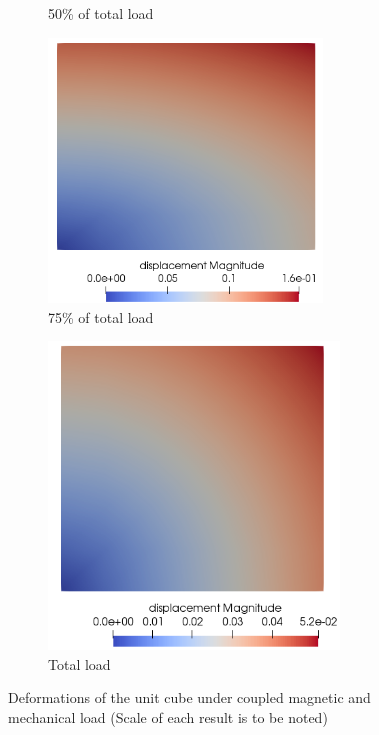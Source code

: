 \documentclass[11pt,a4paper,final]{article}
\begin{document}
\begin{figure}[h]
\begin{subfigure}{0.24\textwidth}
\caption{50\% of total load}
\label{fig:3.9.2}
\end{subfigure}
\begin{subfigure}{0.24\textwidth}
\centering
\includegraphics[width=0.8\textwidth]{unit_test_ls_15_disp.png}
\caption{75\% of total load}
\label{fig:3.9.3}
\end{subfigure}
\begin{subfigure}{0.23\textwidth}
\centering
\includegraphics[width=0.85\textwidth]{unit_test_full_total_load_disp.png}
\caption{Total load}
\label{fig:3.9.4}
\end{subfigure}
\caption{Deformations of the unit cube under coupled magnetic and mechanical load (Scale of each result is to be noted)}
\label{fig:3.9}
\end{figure}
\end{document}
